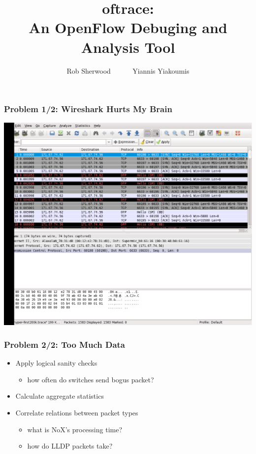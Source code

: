 \documentclass[14pt]{beamer}
\title{oftrace:\\An OpenFlow Debuging and Analysis Tool}
\author{Rob Sherwood ~~~~~ Yiannis Yiakoumis  }
\institute{Stanford Clean Slate Lab}
\newcommand{\subbullet}[1]{\begin{itemize}\item #1\end{itemize}}
\begin{document}
\maketitle

\begin{frame}
\frametitle{Problem 1/2: Wireshark Hurts My Brain}
\begin{center}
\includegraphics[height=.90\textheight]{figures/wireshark}
\end{center}
\end{frame}
\begin{frame}
\frametitle{Problem 2/2: Too Much Data }
\begin{itemize}
\item Apply logical sanity checks
\subbullet{how often do switches send bogus packet? }
\item Calculate aggregate statistics
\item Correlate relations between packet types
\begin{itemize}
\item what is NoX's processing time?
\item how do LLDP packets take?
\end{itemize}
\end{itemize}
\end{frame}
\end{document}
